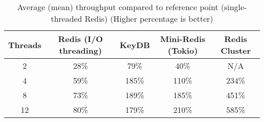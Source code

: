 \begin{table}
    \centering
    \begin{tabular}{c|cccc}
        \toprule
        Threads & Redis (I/O threading) & KeyDB & Mini-Redis (Tokio) & Redis Cluster \\
        \midrule
            2 &   28\% &   79\% &                40\% &           N/A \\
            4 &   59\% &  185\% &               110\% &          234\% \\
            8 &   73\% &  189\% &               185\% &          451\% \\
            12 &   80\% &  179\% &               210\% &          585\% \\
        \bottomrule
    \end{tabular}        
    \caption{Average (mean) throughput compared to reference point (single-threaded Redis) (Higher percentage is better)}
    \label{tbl:table_avg_throughput}
\end{table}
